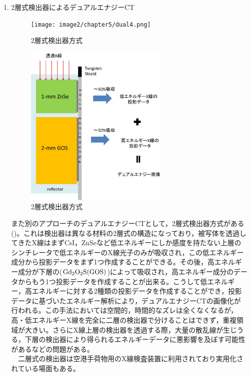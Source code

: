 \begin{enumerate}
\item 2層式検出器によるデュアルエナジーCT

\begin{figure}[H]
 \begin{center}
 \texttt{[image: image2/chapter5/dual4.png]} 
 \end{center}
\caption{2層式検出器方式\cite{philips}}
 \label{fig:two_layer}
\end{figure}

\begin{figure}[H]
 \begin{center}
 \includegraphics[width=7cm]{image/other/two_layer.eps}
 \end{center}
 \caption{2層式検出器方式\cite{philips}}
 \label{fig:two_layer}
\end{figure}
\fi

また別のアプローチのデュアルエナジーCTとして，2層式検出器方式がある()。これは検出器は異なる材料の2層式の構造になっており，被写体を透過してきたX線はまずCsI，ZnSeなど低エネルギーにしか感度を持たない上層のシンチレータで低エネルギーのX線光子のみが吸収され，この低エネルギー成分から投影データをまず1つ作成することができる。その後，高エネルギー成分が下層の($\rm Gd_2O_2S(GOS)$)によって吸収され，高エネルギー成分のデータからもう1つ投影データを作成することが出来る。こうして低エネルギー，高エネルギーに対する2種類の投影データを作成することができ，投影データに基づいたエネルギー解析により，デュアルエナジーCTの画像化が行われる。この手法においては空間的，時間的なズレは全くなくなるが，高・低エネルギーX線を完全に二層の検出器で分けることはできず，重複領域が大きい。さらにX線上層の検出器を透過する際，大量の散乱線が生じうる，下層の検出器により得られるエネルギーデータに悪影響を及ぼす可能性があるなどの問題がある。\\\ \ 二層式の検出器は空港手荷物用のX線検査装置に利用されており実用化されている場面もある\cite{airport_1}\cite{airport_2}。

\end{enumerate}

